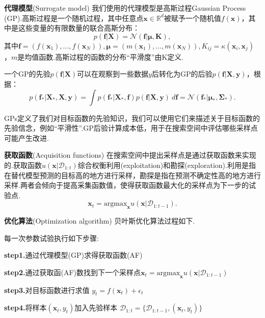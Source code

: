 \documentclass{whutmod}
\begin{document}
\textbf{代理模型}(Surrogate model)
我们使用的代理模型是高斯过程Gaussian Process (GP).高斯过程是一个随机过程，其中任意点$\mathbf{x} \in \mathbb{R}^d$被赋予一个随机值$f(\mathbf{x})$，其中是这些变量的有限数量的联合高斯分布：
\begin{equation}
p(\mathbf{f} \lvert \mathbf{X}) = \mathcal{N}(\mathbf{f} \lvert \boldsymbol\mu, \mathbf{K})\label{eq1},
\end{equation}
其中$ \mathbf{f} = (f(\mathbf{x}_1),...,f(\mathbf{x}_N)), \boldsymbol\mu = (m(\mathbf{x}_1),...,m(\mathbf{x}_N)) , K_{ij} = \kappa(\mathbf{x}_i,\mathbf{x}_j)$，$m$是均值函数.高斯过程的函数的分布“平滑度”由K定义.

一个GP的先验$p(\mathbf{f} \lvert \mathbf{X})$可以在观察到一些数据$y$后转化为GP的后验$p(\mathbf{f} \lvert \mathbf{X},\mathbf{y})$，根据：
\begin{equation}
p(\mathbf{f}_* \lvert \mathbf{X}_*,\mathbf{X},\mathbf{y})= \int{p(\mathbf{f}_* \lvert \mathbf{X}_*,\mathbf{f})p(\mathbf{f} \lvert \mathbf{X},\mathbf{y})}\ d\mathbf{f}= \mathcal{N}(\mathbf{f}_* \lvert \boldsymbol{\mu}_*, \boldsymbol{\Sigma}_*).
\label{eq2}
\end{equation}

GPs定义了我们对目标函数的先验知识，我们可以使用它们来描述关于目标函数的先验信念，例如“平滑性”.GP后验计算成本低，用于在搜索空间中评估哪些采样点可能产生改进.

\textbf{获取函数}(Acquisition functions)
在搜索空间中提出采样点是通过获取函数来实现的.获取函数$u(\mathbf{x} \lvert \mathcal{D}_{1:t})$综合权衡利用(exploitation)和勘探(exploration).利用是指在替代模型预测的目标高的地方进行采样，勘探是指在预测不确定性高的地方进行采样.两者会倾向于提高采集函数值，使得获取函数最大化的采样点为下一步的试验点.
\begin{equation}
\mathbf{x}_t = \mathrm{argmax}_{\mathbf{x}} u(\mathbf{x} \lvert \mathcal{D}_{1:t-1}).
\end{equation}

\textbf{优化算法}(Optimization algorithm)
贝叶斯优化算法过程如下.

每一次参数试验执行如下步骤:

\textbf{step1.}通过代理模型(GP)求得获取函数(AF)

\textbf{step2.}通过获取函(AF)数找到下一个采样点$\mathbf{x}_t = \mathrm{argmax}_{\mathbf{x}} u(\mathbf{x} \lvert \mathcal{D}_{1:t-1})$

\textbf{step3.}对目标函数进行求值 $y_t = f(\mathbf{x}_t) + \epsilon_t$ 

\textbf{step4.}将样本$(\mathbf{x}_t,y_t)$加入先验样本 $\mathcal{D}_{1:t} = \{\mathcal{D}_{1:t-1}, (\mathbf{x}_t,y_t)\}$ 
\end{document}
